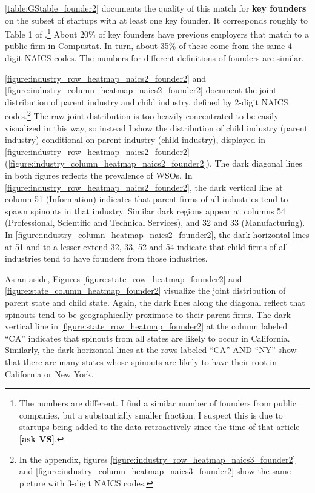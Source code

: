 \documentclass[12pt,english]{article}
\theoremstyle{remark}
\begin{document}
\autoref{table:GStable_founder2} documents the quality of this match for \textbf{key founders} on the subset of startups with at least one key founder. It corresponds roughly to Table 1 of \cite{gompers_entrepreneurial_2005}.\footnote{The numbers are different. I find a similar number of founders from public companies, but a substantially smaller fraction. I suspect this is due to startups being added to the data retroactively since the time of that article \textbf{[ask VS]}.} About 20\% of key founders have previous employers that match to a public firm in Compustat. In turn, about 35\% of these come from the same 4-digit NAICS codes. The numbers for different definitions of founders are similar. 

\autoref{figure:industry_row_heatmap_naics2_founder2} and \autoref{figure:industry_column_heatmap_naics2_founder2} document the joint distribution of parent industry and child industry, defined by 2-digit NAICS codes.\footnote{In the appendix, figures \ref{figure:industry_row_heatmap_naics3_founder2} and \ref{figure:industry_column_heatmap_naics3_founder2} show the same picture with 3-digit NAICS codes.} The raw joint distribution is too heavily concentrated to be easily visualized in this way, so instead I show the distribution of child industry (parent industry) conditional on parent industry (child industry), displayed in \autoref{figure:industry_row_heatmap_naics2_founder2} (\autoref{figure:industry_column_heatmap_naics2_founder2}). The dark diagonal lines in both figures reflects the prevalence of WSOs. In \autoref{figure:industry_row_heatmap_naics2_founder2}, the dark vertical line at column 51 (Information) indicates that parent firms of all industries tend to spawn spinouts in that industry. Similar dark regions appear at columns 54 (Professional, Scientific and Technical Services), and 32 and 33 (Manufacturing). In \autoref{figure:industry_column_heatmap_naics2_founder2}, the dark horizontal lines at 51 and to a lesser extend 32, 33, 52 and 54 indicate that child firms of all industries tend to have founders from those industries.

As an aside, Figures \ref{figure:state_row_heatmap_founder2} and \ref{figure:state_column_heatmap_founder2} visualize the joint distribution of parent state and child state. Again, the dark lines along the diagonal reflect that spinouts tend to be geographically proximate to their parent firms. The dark vertical line in \ref{figure:state_row_heatmap_founder2} at the column labeled ``CA'' indicates that spinouts from all states are likely to occur in California. Similarly, the dark horizontal lines at the rows labeled ``CA'' AND ``NY'' show that there are many states whose spinouts are likely to have their root in California or New York. 
\end{document}
